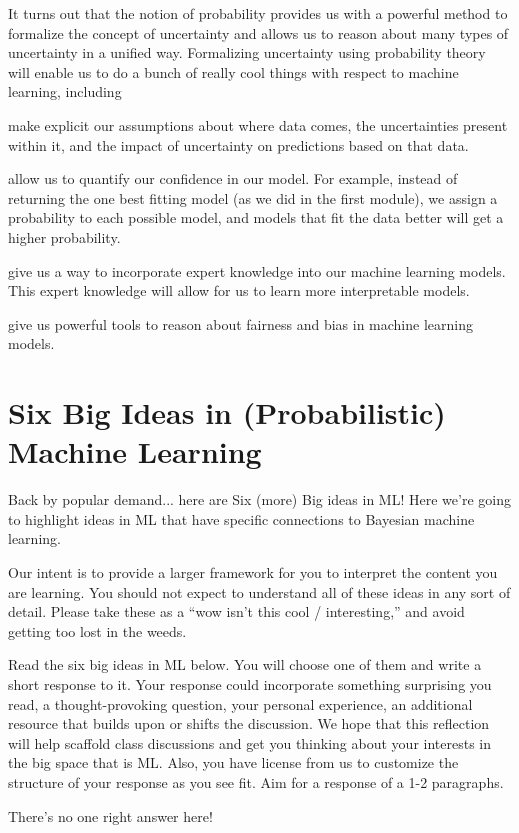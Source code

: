 \documentclass[assignment01_Solutions]{subfiles}
\begin{document}
It turns out that the notion of probability provides us with a powerful method to formalize the concept of uncertainty and allows us to reason about many types of uncertainty in a unified way.  Formalizing uncertainty using probability theory will enable us to do a bunch of really cool things with respect to machine learning, including

\bi
\item make explicit our assumptions about where data comes, the uncertainties present within it, and the impact of uncertainty on predictions based on that data.
\item allow us to quantify our confidence in our model.  For example, instead of returning the one best fitting model (as we did in the first module), we assign a probability to each possible model, and models that fit the data better will get a higher probability.
\item give us a way to incorporate expert knowledge into our machine learning models.  This expert knowledge will allow for us to learn more interpretable models.
\item give us powerful tools to reason about fairness and bias in machine learning models.
\ei

\section{Six Big Ideas in (Probabilistic) Machine Learning}
Back by popular demand... here are Six (more) Big ideas in ML!  Here we're going to highlight ideas in ML that have specific connections to Bayesian machine learning.

\begin{notice}
Our intent is to provide a larger framework for you to interpret the content you are learning.  You should not expect to understand all of these ideas in any sort of detail.  Please take these as a ``wow isn't this cool / interesting,'' and avoid getting too lost in the weeds.
\end{notice}


\begin{exercise}
Read the six big ideas in ML below.  You will choose one of them and write a short response to it.  Your response could incorporate something surprising you read, a thought-provoking question, your personal experience, an additional resource that builds upon or shifts the discussion.  We hope that this reflection will help scaffold class discussions and get you thinking about your interests in the big space that is ML.  Also, you have license from us to customize the structure of your response as you see fit.  Aim for a response of a 1-2 paragraphs.

\begin{boxedsolution}
There's no one right answer here!
\end{boxedsolution}
\end{exercise}
\end{document}
